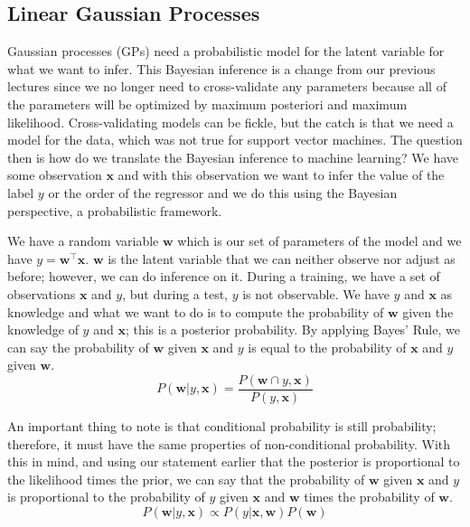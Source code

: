\documentclass[journal]{IEEEtran}
\begin{document}
\subsection{Linear Gaussian Processes}

Gaussian processes (GPs) need a probabilistic model for the latent variable for what we want to infer. This Bayesian inference is a change from our previous lectures since we no longer need to cross-validate any parameters because all of the parameters will be optimized by maximum posteriori and maximum likelihood. Cross-validating models can be fickle, but the catch is that we need a model for the data, which was not true for support vector machines. The question then is how do we translate the Bayesian inference to machine learning? We have some observation \(\mathbf{x}\) and with this observation we want to infer the value of the label \(y\) or the order of the regressor and we do this using the Bayesian perspective, a probabilistic framework.

We have a random variable \(\mathbf{w}\) which is our set of parameters of the model and we have \(y=\mathbf{w}^\top \mathbf{x}\). \(\mathbf{w}\) is the latent variable that we can neither observe nor adjust as before; however, we can do inference on it. During a training, we have a set of observations \(\mathbf{x}\) and \(y\), but during a test, \(y\) is not observable. We have \(y\) and \(\mathbf{x}\) as knowledge and what we want to do is to compute the probability of \(\mathbf{w}\) given the knowledge of \(y\) and \(\mathbf{x}\); this is a posterior probability. By applying Bayes' Rule, we can say the probability of \(\mathbf{w}\) given \(\mathbf{x}\) and \(y\) is equal to the probability of \(\mathbf{x}\) and \(y\) given \(\mathbf{w}\).
\begin{equation}
    P(\mathbf{w}\big|y,\mathbf{x}) = \frac{P(\mathbf{w}\cap y,\mathbf{x})}{P(y,\mathbf{x})}
\end{equation}

An important thing to note is that conditional probability is still probability; therefore, it must have the same properties of non-conditional probability. With this in mind, and using our statement earlier that the posterior is proportional to the likelihood times the prior, we can say that the probability of \(\mathbf{w}\) given \(\mathbf{x}\) and \(y\) is proportional to the probability of \(y\) given \(\mathbf{x}\) and \(\mathbf{w}\) times the probability of \(\mathbf{w}\).
\begin{equation}
    P(\mathbf{w}\big|y,\mathbf{x}) \propto P(y\big|\mathbf{x},\mathbf{w})P(\mathbf{w})
\end{equation}
\end{document}
